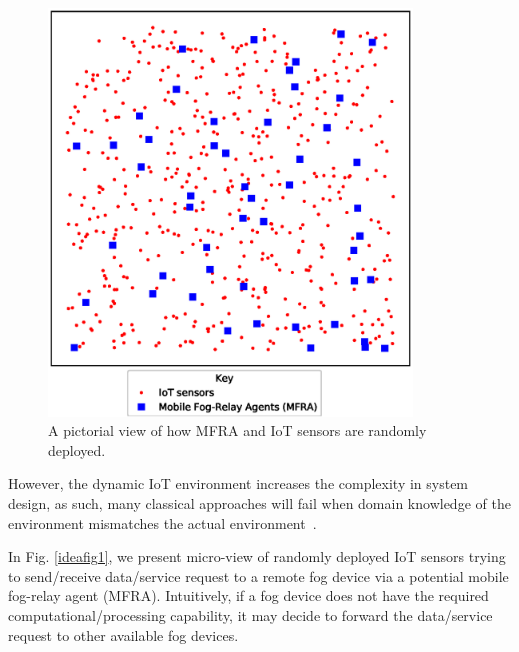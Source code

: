 \documentclass[journal]{IEEEtran}
\begin{document}
\begin{figure}[!t]
\centering
\includegraphics[width=3.8in]{random_deploy.eps}
\caption{A pictorial view of how MFRA and IoT sensors are randomly deployed.}
\label{random_deploy}
\end{figure}


However, the dynamic IoT environment increases the complexity in system design, as such, many classical approaches will fail when domain knowledge of the environment mismatches the actual environment~\cite{Yau2012}.

 In Fig. \ref{ideafig1}, we present micro-view of randomly deployed IoT sensors trying to send/receive data/service request to a remote fog device via a potential mobile fog-relay agent (MFRA). Intuitively, if a fog device does not have the required computational/processing capability, it may decide to forward the data/service request to other available fog devices.



\end{document}
